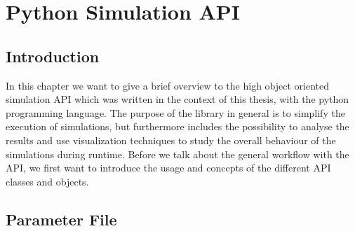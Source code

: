 \chapter{Python Simulation API}

\section{Introduction}

In this chapter we want to give a brief overview to the high object oriented simulation API which
was written in the context of this thesis, with the python programming language.
The purpose of the library in general is to simplify the execution of simulations, but furthermore
includes the possibility to analyse the results and use visualization techniques to study the overall
behaviour of the simulations during runtime.
Before we talk about the general workflow with the API, we first want to introduce the usage
and concepts of the different API classes and objects.

\section{Parameter File}

